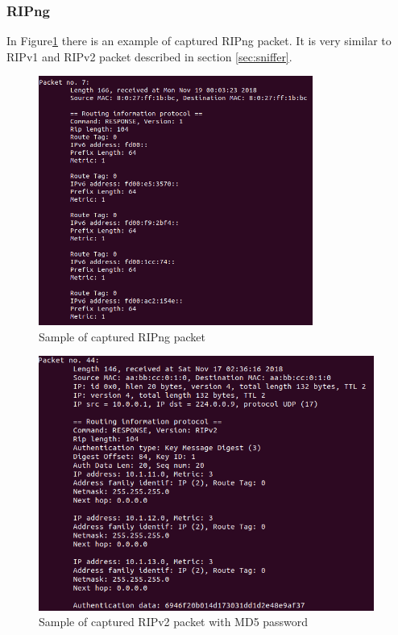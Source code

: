\documentclass[11pt,a4paper]{article}
\begin{document}
\subsubsection{RIPng}
In Figure\ref{fig:ripng} there is an example of captured RIPng packet. It is very similar to RIPv1 and RIPv2 packet described in section \ref{sec:sniffer}. 

\begin{figure}[H]
	
	\includegraphics[width=9cm]{img/ipv6.png} 
	\caption{Sample of captured RIPng packet}
	\label{fig:ripng}

\end{figure}

\begin{figure}[H]
	
	\includegraphics[width=11cm]{img/md5.png} 
	\caption{Sample of captured RIPv2 packet with MD5 password}
	\label{fig:md5}

\end{figure}     
\end{document}
